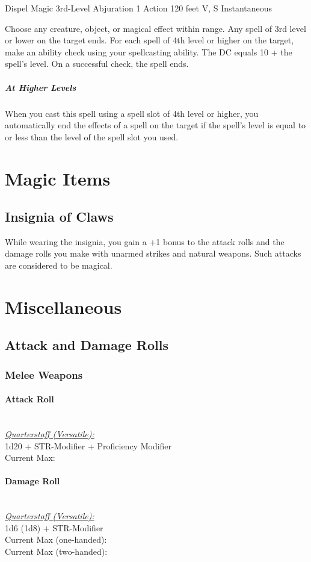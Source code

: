 {\DndSpellHeader
  {Dispel Magic}
  {3rd-Level Abjuration}
  {1 Action}
  {120 feet}
  {V, S}
  {Instantaneous}

Choose any creature, object, or magical effect within range. Any spell of 3rd level or lower on the target ends. For each spell of 4th level or higher on the target, make an ability check using your spellcasting ability. The DC equals 10 + the spell's level. On a successful check, the spell ends.

\subparagraph*{At Higher Levels} When you cast this spell using a spell slot of 4th level or higher, you automatically end the effects of a spell on the target if the spell's level is equal to or less than the level of the spell slot you used.

\section*{Magic Items}
\subsection*{Insignia of Claws}
While wearing the insignia, you gain a +1 bonus to the attack rolls and the damage rolls you make with unarmed strikes and natural weapons. Such attacks are considered to be magical.

\section*{Miscellaneous}
\subsection*{Attack and Damage Rolls}
\subsubsection*{Melee Weapons}
\paragraph*{Attack Roll}\hfill\\
\underline{\textit{Quarterstaff (Versatile):}}\\
1d20 + STR-Modifier + Proficiency Modifier\\
\indent Current Max: 
\paragraph*{Damage Roll}\hfill\\
\underline{\textit{Quarterstaff (Versatile):}}\\
1d6 (1d8) + STR-Modifier\\
\indent Current Max (one-handed): \\
\indent Current Max (two-handed): 
}
